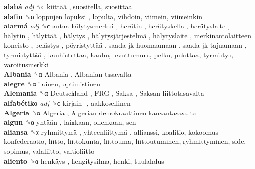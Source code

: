 \textbf{alabá} \emph{adj}  ␝ϲ   kiittää , suositella, suosittaa  \\
\textbf{alafin} ␝α   loppujen lopuksi , lopulta, vihdoin, viimein, viimeinkin  \\
\textbf{alarmá} \emph{adj}  ␝ϲ   antaa hälytysmerkki ,  herätin ,  herätyskello ,  herätyslaite ,  hälytin ,  hälyttää ,  hälytys ,  hälytysjärjestelmä ,  hälytyslaite ,  merkinantolaitteen koneisto ,  pelästys ,  pöyristyttää ,  saada jk huomaamaan ,  saada jk tajuamaan ,  tyrmistyttää , kauhistuttaa, kauhu, levottomuus, pelko, pelottaa, tyrmistys, varoitusmerkki  \\
\textbf{Albania} ␝α   Albania ,  Albanian tasavalta   \\
\textbf{alegre} ␝α  iloinen, optimistinen  \\
\textbf{Alemania} ␝α   Deutschland ,  FRG ,  Saksa ,  Saksan liittotasavalta   \\
\textbf{alfabétiko} \emph{adj}  ␝ϲ   kirjain- , aakkosellinen  \\
\textbf{Algeria} ␝α   Algeria ,  Algerian demokraattinen kansantasavalta   \\
\textbf{algun} ␝α   yhtään , lainkaan, ollenkaan, sen  \\
\textbf{aliansa} ␝α   ryhmittymä ,  yhteenliittymä , allianssi, koalitio, kokoomus, konfederaatio, liitto, liittokunta, liittouma, liittoutuminen, ryhmittyminen, side, sopimus, valaliitto, valtioliitto  \\
\textbf{aliento} ␝α   henkäys , hengitysilma, henki, tuulahdus  \\
